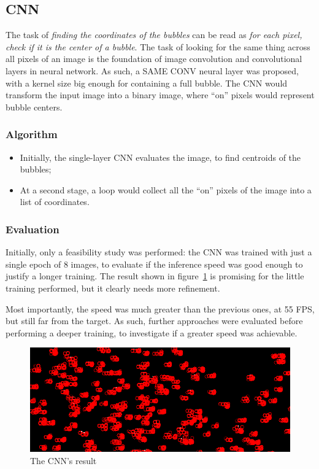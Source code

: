 \subsection{CNN}

The task of \textit{finding the coordinates of the bubbles} can be read as \textit{for each pixel, check if it is the center of a bubble}.
The task of looking for the same thing across all pixels of an image is the foundation of image convolution and convolutional layers in neural network.
As such, a SAME CONV neural layer was proposed, with a kernel size big enough for containing a full bubble.
The CNN would transform the input image into a binary image, where ``on'' pixels would represent bubble centers.

\subsubsection{Algorithm}

\begin{itemize}
	\itemsep 0em
	\item Initially, the single-layer CNN evaluates the image, to find centroids of the bubbles;
	\item At a second stage, a loop would collect all the ``on'' pixels of the image into a list of coordinates.
\end{itemize}

\subsubsection{Evaluation}

Initially, only a feasibility study was performed: the CNN was trained with just a single epoch of 8 images, to evaluate if the inference speed was good enough to justify a longer training.
The result shown in figure~\ref{fig:locate:cnn} is promising for the little training performed, but it clearly needs more refinement.

Most importantly, the speed was much greater than the previous ones, at 55 FPS, but still far from the target.
As such, further approaches were evaluated before performing a deeper training, to investigate if a greater speed was achievable.

\begin{figure}
	\centerline{\includegraphics[width=\locateimgsize]{images/locate/cnn.png}}
	\caption{\centering The CNN's result}
	\label{fig:locate:cnn}
\end{figure}
